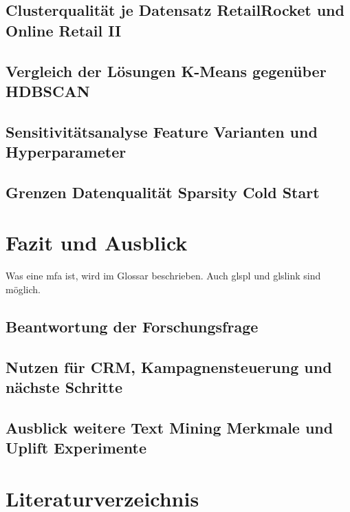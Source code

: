 \documentclass[
  11pt,
  openany, oneside]{book}
\begin{document}
\section{Clusterqualität je Datensatz RetailRocket und Online Retail
II}\label{sec-clusterqualitaet}

\section{Vergleich der Lösungen K-Means gegenüber
HDBSCAN}\label{sec-vergleich}

\section{Sensitivitätsanalyse Feature Varianten und
Hyperparameter}\label{sec-sensitivitaetsanalyse}

\section{Grenzen Datenqualität Sparsity Cold Start}\label{sec-grenzen}

\chapter{Fazit und Ausblick}\label{fazit-und-ausblick}

Was eine \gls{mfa} ist, wird im Glossar beschrieben. Auch glspl und
glslink sind möglich.

\section{Beantwortung der
Forschungsfrage}\label{beantwortung-der-forschungsfrage}

\section{Nutzen für CRM, Kampagnensteuerung und nächste
Schritte}\label{nutzen-fuxfcr-crm-kampagnensteuerung-und-nuxe4chste-schritte}

\section{Ausblick weitere Text Mining Merkmale und Uplift
Experimente}\label{ausblick-weitere-text-mining-merkmale-und-uplift-experimente}

\chapter*{Literaturverzeichnis}\label{literaturverzeichnis}
\end{document}
